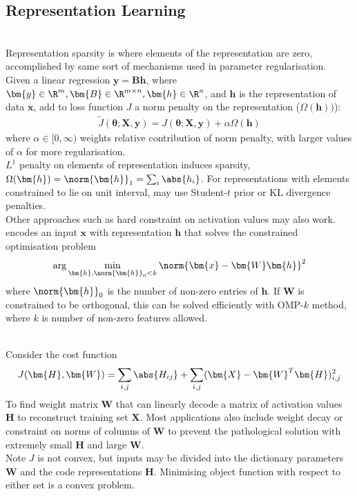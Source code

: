\subsection{Representation Learning}

\begin{remark} \\
Representation sparsity is where elements of the representation are zero, accomplished by same sort of mechanisms used in parameter regularisation.\\
Given a linear regression $\bm{y} = \bm{B} \bm{h}$, where $\bm{y} \in \R^m, \bm{B} \in \R^{m \times n}, \bm{h} \in \R^n$, and $\bm{h}$ is the representation of data $\bm{x}$, add to loss function $J$ a norm penalty on the representation ($\Omega(\bm{h}))$):
\begin{align}
\tilde{J}(\bm{\theta}; \bm{X}, \bm{y}) = J(\bm{\theta}; \bm{X}, \bm{y}) + \alpha \Omega (\bm{h}) \nonumber
\end{align}
where $\alpha \in [0, \infty)$ weights relative contribution of norm penalty, with larger values of $\alpha$ for more regularisation.\\
$L^1$ penalty on elements of representation induces sparsity, $\Omega(\bm{h}) = \norm{\bm{h}}_1 = \sum_i \abs{h_i}$. For representations with elements constrained to lie on unit interval, may use Student-$t$ prior or KL divergence penalties.\\
Other approaches such as hard constraint on activation values may also work.  encodes an input $\bm{x}$ with representation $\bm{h}$ that solves the constrained optimisation problem
\begin{align}
\arg \min_{\bm{h}, \norm{\bm{h}}_0 < k} \norm{\bm{x} - \bm{W} \bm{h}}^2 \nonumber
\end{align}
where $\norm{\bm{h}}_0$ is the number of non-zero entries of $\bm{h}$. If $\bm{W}$ is constrained to be orthogonal, this can be solved efficiently with OMP-$k$ method, where $k$ is number of non-zero features allowed.
\end{remark}

\begin{example} \\
Consider the cost function
\begin{align}
J(\bm{H}, \bm{W}) = \sum\limits_{i,j} \abs{H_{ij}} + \sum\limits_{i,j} (\bm{X} - \bm{W}^T \bm{H})^2_{i,j} \nonumber
\end{align}
To find weight matrix $\bm{W}$ that can linearly decode a matrix of activation values $\bm{H}$ to reconstruct training set $\bm{X}$. Most applications also include weight decay or constraint on norms of columns of $\bm{W}$ to prevent the pathological solution with extremely small $\bm{H}$ and large $\bm{W}$.\\
Note $J$ is not convex, but inputs may be divided into the dictionary parameters $\bm{W}$ and the code representations $\bm{H}$. Minimising object function with respect to either set is a convex problem.
\end{example}
